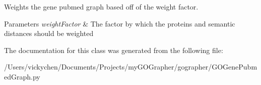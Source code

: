 Weights the gene pubmed graph based off of the weight factor. 


\begin{DoxyParams}{Parameters}
{\em weightFactor} & The factor by which the proteins and semantic distances should be weighted \\
\hline
\end{DoxyParams}


The documentation for this class was generated from the following file:\begin{DoxyCompactItemize}
\item 
/Users/vickychen/Documents/Projects/myGOGrapher/gographer/GOGenePubmedGraph.py\end{DoxyCompactItemize}
